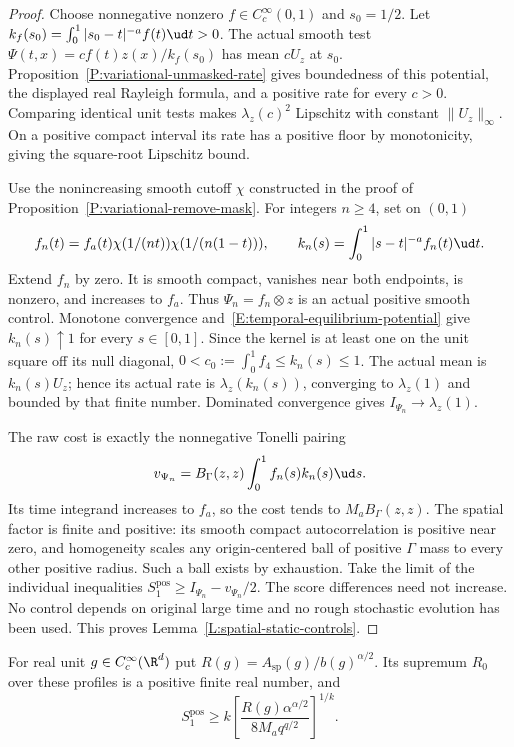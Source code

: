 \begin{proof}
  Choose nonnegative nonzero $f\in C_c^\infty(0,1)$ and $s_0=1/2$.
  Let $k_f(s_0)=\int_0^1|s_0-t|^{-a}f(t)\ud t>0$.
  The actual smooth test $\Psi(t,x)=cf(t)z(x)/k_f(s_0)$
  has mean $cU_z$ at $s_0$.
  Proposition~\ref{P:variational-unmasked-rate} gives boundedness
  of this potential, the displayed real Rayleigh formula, and a
  positive rate for every $c>0$.
  Comparing identical unit tests makes $\lambda_z(c)^2$ Lipschitz
  with constant $\|U_z\|_\infty$.
  On a positive compact interval its rate has a positive floor
  by monotonicity, giving the square-root Lipschitz bound.

  Use the nonincreasing smooth cutoff $\chi$ constructed in the
  proof of Proposition~\ref{P:variational-remove-mask}.
  For integers $n\ge4$, set on $(0,1)$
  \[
    f_n(t)=f_a(t)\chi(1/(nt))\chi(1/(n(1-t))),\qquad
    k_n(s)=\int_0^1|s-t|^{-a}f_n(t)\ud t.
  \]
  Extend $f_n$ by zero. It is smooth compact, vanishes near both
  endpoints, is nonzero, and increases to $f_a$.
  Thus $\Psi_n=f_n\otimes z$ is an actual positive smooth control.
  Monotone convergence and~\eqref{E:temporal-equilibrium-potential}
  give $k_n(s)\uparrow1$ for every $s\in[0,1]$.
  Since the kernel is at least one on the unit square off its
  null diagonal,
  $0<c_0:=\int_0^1f_4\le k_n(s)\le1$.
  The actual mean is $k_n(s)U_z$; hence its actual rate is
  $\lambda_z(k_n(s))$, converging to $\lambda_z(1)$ and bounded
  by that finite number. Dominated convergence gives
  $I_{\Psi_n}\to\lambda_z(1)$.

  The raw cost is exactly the nonnegative Tonelli pairing
  \[
    v_{\Psi_n}=B_\Gamma(z,z)\int_0^1f_n(s)k_n(s)\ud s.
  \]
  Its time integrand increases to $f_a$, so the cost tends to
  $M_aB_\Gamma(z,z)$.
  The spatial factor is finite and positive: its smooth compact
  autocorrelation is positive near zero, and homogeneity scales
  any origin-centered ball of positive $\Gamma$ mass to every
  other positive radius. Such a ball exists by exhaustion.
  Take the limit of the individual inequalities
  $S_1^{\mathrm{pos}}\ge I_{\Psi_n}-v_{\Psi_n}/2$.
  The score differences need not increase.
  No control depends on original large time and no rough
  stochastic evolution has been used.
  This proves Lemma~\ref{L:spatial-static-controls}.
\end{proof}

\begin{proposition}
  \label{P:spatial-smooth-ratio}
  For real unit $g\in C_c^\infty(\R^d)$ put
  $R(g)=A_{\mathrm{sp}}(g)/b(g)^{\alpha/2}$.
  Its supremum $R_0$ over these profiles is a positive finite
  real number, and
  \begin{equation}\label{E:spatial-smooth-score}
    S_1^{\mathrm{pos}}\ge
    k\left[
    \frac{R(g)\alpha^{\alpha/2}}{8M_aq^{q/2}}
    \right]^{1/k}.
  \end{equation}
\end{proposition}

